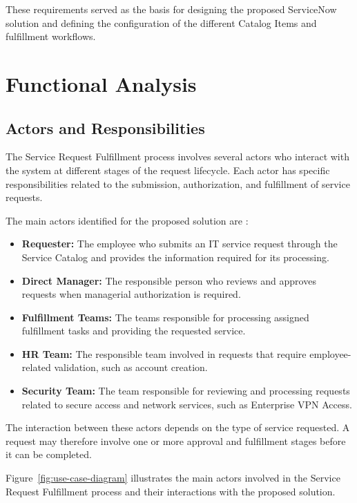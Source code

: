 \documentclass[12pt,a4paper]{report}
\begin{document}
These requirements served as the basis for designing the proposed ServiceNow
solution and defining the configuration of the different Catalog Items and
fulfillment workflows.

\section{Functional Analysis}

\subsection{Actors and Responsibilities}
The Service Request Fulfillment process involves several actors who interact with the system 
at different stages of the request lifecycle. Each actor has specific responsibilities related 
to the submission, authorization, and fulfillment of service requests. 

The main actors identified for the proposed solution are : 

\begin{itemize}
    \item \textbf{Requester:} The employee who submits an IT service request
    through the Service Catalog and provides the information required for its
    processing.

    \item \textbf{Direct Manager:} The responsible person who reviews and approves
    requests when managerial authorization is required.

    \item \textbf{Fulfillment Teams:} The teams responsible for
    processing assigned fulfillment tasks and providing the requested service.

    \item \textbf{HR Team:} The responsible team involved in requests that
    require employee-related validation, such as account creation.

    \item \textbf{Security Team:} The team responsible for
    reviewing and processing requests related to secure access and network
    services, such as Enterprise VPN Access.
\end{itemize}

The interaction between these actors depends on the type of service
requested. A request may therefore involve one or more approval and
fulfillment stages before it can be completed.

Figure~\ref{fig:use-case-diagram} illustrates the main actors involved in the
Service Request Fulfillment process and their interactions with the proposed
solution.
\end{document}
